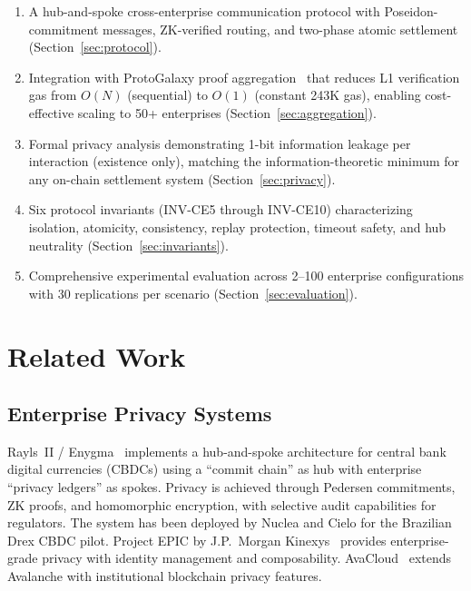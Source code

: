 \documentclass[conference]{IEEEtran}
\begin{document}
\begin{enumerate}
  \item A hub-and-spoke cross-enterprise communication protocol with
        Poseidon-commitment messages, ZK-verified routing, and two-phase
        atomic settlement (Section~\ref{sec:protocol}).
  \item Integration with ProtoGalaxy proof aggregation~\cite{rul10} that
        reduces L1 verification gas from $O(N)$ (sequential) to $O(1)$
        (constant 243K gas), enabling cost-effective scaling to 50+
        enterprises (Section~\ref{sec:aggregation}).
  \item Formal privacy analysis demonstrating 1-bit information leakage per
        interaction (existence only), matching the information-theoretic
        minimum for any on-chain settlement system
        (Section~\ref{sec:privacy}).
  \item Six protocol invariants (INV-CE5 through INV-CE10) characterizing
        isolation, atomicity, consistency, replay protection, timeout safety,
        and hub neutrality (Section~\ref{sec:invariants}).
  \item Comprehensive experimental evaluation across 2--100 enterprise
        configurations with 30 replications per scenario
        (Section~\ref{sec:evaluation}).
\end{enumerate}


\section{Related Work}
\label{sec:related}

\subsection{Enterprise Privacy Systems}

Rayls~II / Enygma~\cite{rayls2025, rayles_sp2024} implements a
hub-and-spoke architecture for central bank digital currencies (CBDCs) using a
``commit chain'' as hub with enterprise ``privacy ledgers'' as spokes.
Privacy is achieved through Pedersen commitments, ZK proofs, and homomorphic
encryption, with selective audit capabilities for regulators. The system has
been deployed by Nuclea and Cielo for the Brazilian Drex CBDC pilot. Project
EPIC by J.P.~Morgan Kinexys~\cite{epic2024} provides enterprise-grade
privacy with identity management and composability. AvaCloud~\cite{avacloud2024}
extends Avalanche with institutional blockchain privacy features.
\end{document}
